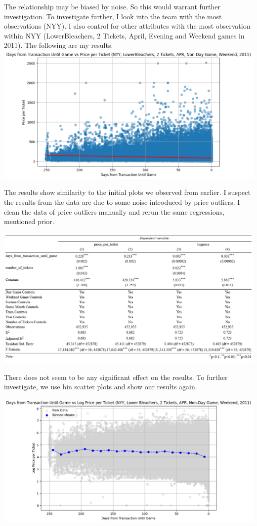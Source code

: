 \documentclass[
  12pt]{article}
\begin{document}
The relationship may be biased by noise. So this would warrant further
investigation. To investigate further, I look into the team with the
most observations (NYY). I also control for other attributes with the
most observation within NYY (LowerBleachers, 2 Tickets, April, Evening
and Weekend games in 2011). The following are my
results.\includegraphics{images/18.png}

The results show similarity to the initial plots we observed from
earlier. I suspect the results from the data are due to some noise
introduced by price outliers. I clean the data of price outliers
manually and rerun the same regressions, mentioned prior.

\includegraphics{images/5.png}

There does not seem to be any significant effect on the results. To
further investigate, we use bin scatter plots and show our results
again.

\includegraphics{images/11.png}
\end{document}
